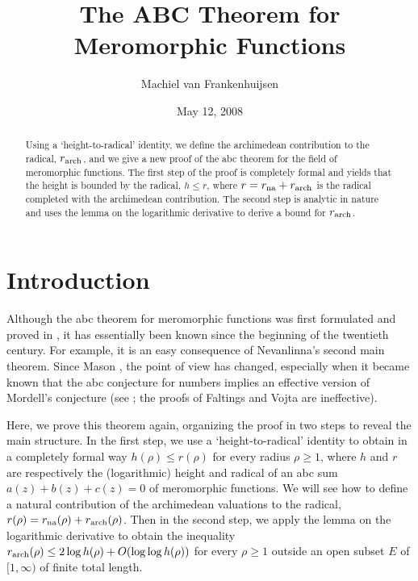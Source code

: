 \documentclass{amsart}
\newcommand\arch{{\textup{arch}}}	\newcommand\na{{\textup{na}}}
\theoremstyle{definition}\newtheorem{definition}[theorem]{Definition}
\theoremstyle{remark}\newtheorem{remark}[theorem]{Remark}
\numberwithin{equation}{section}
\begin{document}
\title{The ABC Theorem for Meromorphic Functions}

\author{Machiel van Frankenhuijsen}

\address{Utah Valley University,
Department of Mathematics,
800 West University Parkway,
Orem, Utah 84058-5999}


\date{May 12, 2008}


\begin{abstract}
Using a `height-to-radical' identity,
 we define the archimedean contribution to the radical,
$r_\arch$,
and we give a new proof of the abc theorem for the field of meromorphic functions.
The first step of the proof is completely formal and yields that the height is bounded by the radical,
$h\leq r$,
where $r=r_\na+r_\arch$ is the radical completed with the archimedean contribution.
The second step is analytic in nature and uses the lemma on the logarithmic derivative to derive a bound for $r_\arch$.
\end{abstract}

\maketitle

\section{Introduction}
\label{S: intro}

Although the abc theorem for meromorphic functions was first formulated and proved in \cite{thesis},
it has essentially been known since the beginning of the twentieth century.
For example,
it is an easy consequence of Nevanlinna's second main theorem.
Since Mason \cite{Mason},
the point of view has changed,
especially when it became known that the abc conjecture for numbers implies an effective version of Mordell's conjecture
(see \cite{Elkies,abcRM,abcvhi,abcrvhi};
the proofs of Faltings and Vojta \cite{F1,F2,VojtaMordell} are ineffective).

Here,
we prove this theorem again,
organizing the proof in two steps to reveal the main structure.
In the first step,
we use a `height-to-radical' identity to obtain in a completely formal way $h(\rho)\leq r(\rho)$ for every radius $\rho\geq1$,
where $h$ and $r$ are respectively the (logarithmic) height and radical of an abc sum $a(z)+b(z)+c(z)=0$
of meromorphic functions.
We will see how to define a natural contribution of the archimedean valuations to the radical,
$r(\rho)=r_\na(\rho)+r_\arch(\rho)$.
Then in the second step,
we apply the lemma on the logarithmic derivative to obtain the inequality $r_\arch(\rho)\leq2\log h(\rho)+O(\log\log h(\rho))$
for every $\rho\geq1$ outside an open subset $E$ of $[1,\infty)$ of finite total length.\medskip
\end{document}

